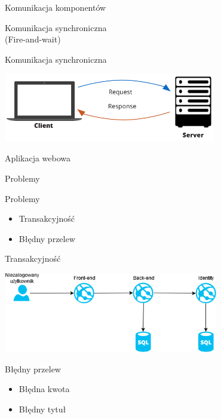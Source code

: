 \documentclass{beamer}
\begin{document}
\begin{frame}{Komunikacja komponentów}
	\begin{center}
		\Huge{Komunikacja synchroniczna}\\
		\huge{(Fire-and-wait)}
	\end{center}
\end{frame}

\begin{frame}{Komunikacja synchroniczna}
	\begin{center}
		\includegraphics[height=3cm]{prosta_komunikacja2.png}
	\end{center}
\end{frame}

\begin{frame}{Aplikacja webowa}
	\begin{center}
		\Huge{Problemy}
	\end{center}
\end{frame}

\begin{frame}{Problemy}
	\begin{huge}
		\begin{itemize}
			\item Transakcyjność
			\item Błędny przelew
		\end{itemize}
	\end{huge}
\end{frame}

\begin{frame}{Transakcyjność}
	\begin{center}
		\includegraphics[height=3.5cm]{transaction2.png}
	\end{center}
\end{frame}

\begin{frame}{Błędny przelew}
	\begin{huge}
		\begin{itemize}
			\item Błędna kwota
			\item Błędny tytuł
		\end{itemize}
	\end{huge}
\end{frame}
\end{document}
